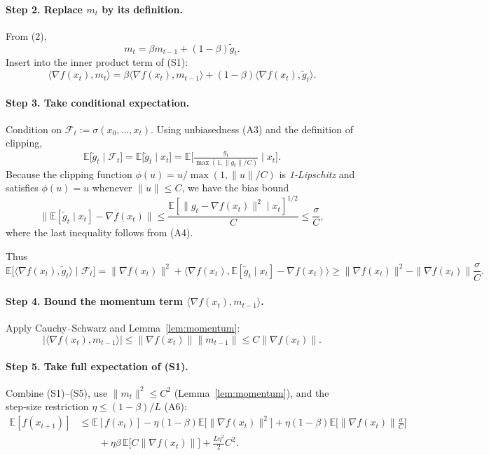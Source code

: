\documentclass{article}
\newcommand{\E}{\mathbb{E}}
\begin{document}
\paragraph{Step 2. Replace $m_t$ by its definition.}  
From (2),
\[
m_t = \beta m_{t-1}+(1-\beta)\tilde g_t .
\]
Insert into the inner product term of (S1):
\[
\langle\nabla f(x_t),m_t\rangle
= \beta\langle\nabla f(x_t),m_{t-1}\rangle
+(1-\beta)\langle\nabla f(x_t),\tilde g_t\rangle .
\tag{S2}
\]

\paragraph{Step 3. Take conditional expectation.}  
Condition on $\mathcal{F}_t:=\sigma(x_0,\dots,x_t)$.
Using unbiasedness (A3) and the definition of clipping,
\[
\E\!\bigl[\tilde g_t\mid\mathcal{F}_t\bigr]
= \E\!\bigl[\tilde g_t\mid x_t\bigr]
= \E\!\bigl[\tfrac{g_t}{\max(1,\|g_t\|/C)}\mid x_t\bigr].
\]
Because the clipping function $\phi(u)=u/\max(1,\|u\|/C)$ is \emph{1‑Lipschitz} and satisfies $\phi(u)=u$ whenever $\|u\|\le C$, we have the bias bound
\[
\bigl\|\E[\tilde g_t\mid x_t]-\nabla f(x_t)\bigr\|
\le \frac{\E[\|g_t-\nabla f(x_t)\|^2\mid x_t]^{1/2}}{C}
\le \frac{\sigma}{C},
\tag{S3}
\]
where the last inequality follows from (A4).  

Thus
\[
\E\!\bigl[\langle\nabla f(x_t),\tilde g_t\rangle\mid\mathcal{F}_t\bigr]
= \|\nabla f(x_t)\|^2 + \langle\nabla f(x_t),\E[\tilde g_t\mid x_t]-\nabla f(x_t)\rangle
\ge \|\nabla f(x_t)\|^2 - \|\nabla f(x_t)\|\frac{\sigma}{C}.
\tag{S4}
\]

\paragraph{Step 4. Bound the momentum term $\langle\nabla f(x_t),m_{t-1}\rangle$.}  
Apply Cauchy–Schwarz and Lemma~\ref{lem:momentum}:
\[
|\langle\nabla f(x_t),m_{t-1}\rangle|
\le \|\nabla f(x_t)\|\|m_{t-1}\|
\le C\|\nabla f(x_t)\|.
\tag{S5}
\]

\paragraph{Step 5. Take full expectation of (S1).}  
Combine (S1)–(S5), use $\|m_t\|^2\le C^2$ (Lemma~\ref{lem:momentum}), and the step‑size restriction $\eta\le (1-\beta)/L$ (A6):
\[
\begin{aligned}
\E[f(x_{t+1})] 
&\le \E[f(x_t)]
-\eta(1-\beta)\E\!\bigl[\|\nabla f(x_t)\|^2\bigr] 
+ \eta(1-\beta)\E\!\bigl[\|\nabla f(x_t)\|\tfrac{\sigma}{C}\bigr]   \\
&\qquad +\eta\beta\,\E\!\bigl[ C\|\nabla f(x_t)\|\bigr]
+\frac{L\eta^2}{2}C^2 .
\end{aligned}
\tag{S6}
\]
\end{document}
